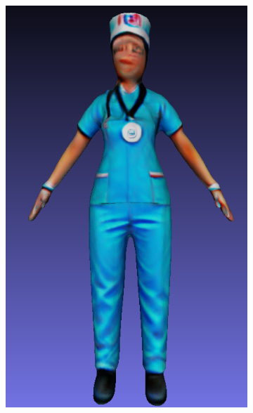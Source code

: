 \begin{figure}[H]
\begin{subfigure}[b]{0.13\textwidth}
        \caption{}
    \end{subfigure}
    \begin{subfigure}[b]{0.188\textwidth}
        \centering
        \includegraphics[width=\textwidth]{figures/future/bias_nurse_genie_2.png}
        \caption{}
    \end{subfigure}
    \begin{subfigure}[b]{0.26\textwidth}
        \centering

\end{subfigure}
\end{figure}
